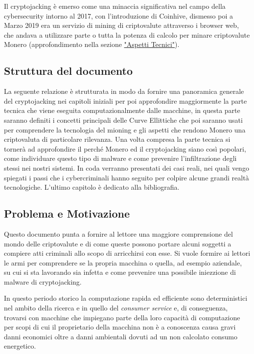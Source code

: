 \documentclass[12pt,a4paper]{article}
\begin{document}
Il cryptojacking è emerso come una minaccia significativa nel campo della
cybersecurity intorno al 2017, con l'introduzione di Coinhive, dismesso poi a
Marzo 2019 era un servizio di mining di criptovalute attraverso i browser web,
che andava a utilizzare parte o tutta la potenza di calcolo per minare
criptovalute Monero (approfondimento nella sezione
\hyperref[sec:aspetti_tecnici]{"Aspetti Tecnici"}). 

\subsection{Struttura del documento}
La seguente relazione è strutturata in modo da fornire una panoramica generale
del cryptojacking nei capitoli iniziali per poi approfondire maggiormente la
parte tecnica che viene eseguita computazionalmente dalle macchine, in questa
parte saranno definiti i concetti principali delle Curve Ellittiche che poi
saranno usati per comprendere la tecnologia del mioning e gli aspetti che
rendono Monero una criptovaluta di particolare rilevanza. Una volta compresa la
parte tecnica si tornerà ad approfondire il perché Monero ed il cryptojacking
siano così popolari, come individuare questo tipo di malware e come prevenire
l'infiltrazione degli stessi nei nostri sistemi. In coda verranno presentati dei
casi reali, nei quali vengo spiegati i passi che i cybercriminali hanno seguito
per colpire alcune grandi realtà tecnologiche. L'ultimo capitolo è dedicato alla
bibliografia.

\subsection{Problema e Motivazione}
Questo documento punta a fornire al lettore una maggiore comprensione del mondo
delle criptovalute e di come queste possono portare alcuni soggetti a compiere
atti criminali allo scopo di arricchirsi con esse. Si vuole formire ai lettori
le armi per comprendere se la propria macchina o quella, ad esempio aziendale,
su cui si sta lavorando sia infetta e come prevenire una possibile iniezzione di
malware di cryptojacking.

In questo periodo storico la computazione rapida ed efficiente sono
deterministici nel ambito della ricerca e in quello del \textit{consumer
service} e, di conseguenza, trovarsi con macchine che impiegano parte della loro
capacità di computazione per scopi di cui il proprietario della macchina non è a
conoscenza causa gravi danni economici oltre a danni ambientali dovuti ad un non
calcolato consumo energetico.
\end{document}
